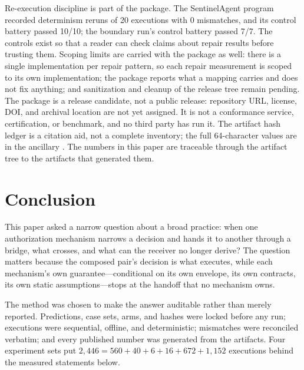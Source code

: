 \documentclass[sigconf,anonymous,nonacm]{acmart}
\newcommand{\code}[1]{\texttt{\detokenize{#1}}}
\begin{document}
Re-execution discipline is part of the package. The SentinelAgent program recorded determinism reruns of 20 executions with 0 mismatches, and its control battery passed 10/10; the boundary run's control battery passed 7/7. The controls exist so that a reader can check claims about repair results before trusting them. Scoping limits are carried with the package as well: there is a single implementation per repair pattern, so each repair measurement is scoped to its own implementation; the package reports what a mapping carries and does not fix anything; and sanitization and cleanup of the release tree remain pending. The package is a release candidate, not a public release: repository URL, license, DOI, and archival location are not yet assigned. It is not a conformance service, certification, or benchmark, and no third party has run it. The artifact hash ledger is a citation aid, not a complete inventory; the full 64-character values are in the ancillary \code{hashes.txt}. The numbers in this paper are traceable through the artifact tree to the artifacts that generated them.

\section{Conclusion}

This paper asked a narrow question about a broad practice: when one authorization mechanism narrows a decision and hands it to another through a bridge, what crosses, and what can the receiver no longer derive? The question matters because the composed pair's decision is what executes, while each mechanism's own guarantee---conditional on its own envelope, its own contracts, its own static assumptions---stops at the handoff that no mechanism owns.

The method was chosen to make the answer auditable rather than merely reported. Predictions, case sets, arms, and hashes were locked before any run; executions were sequential, offline, and deterministic; mismatches were reconciled verbatim; and every published number was generated from the artifacts. Four experiment sets put $2{,}446 = 560 + 40 + 6 + 16 + 672 + 1{,}152$ executions behind the measured statements below.
\end{document}
